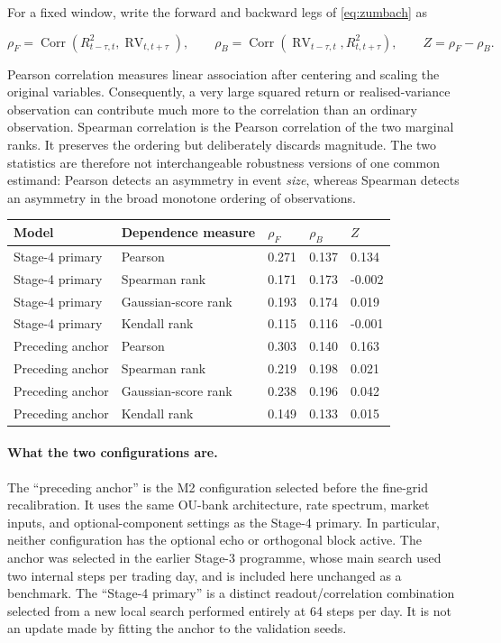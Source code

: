 \documentclass[11pt,a4paper]{article}
\newcommand{\Corr}{\operatorname{Corr}}
\begin{document}
For a fixed window, write the forward and backward legs of \cref{eq:zumbach} as

\begin{equation}
 \rho_F=\Corr\left(R_{t-\tau,t}^2,\operatorname{RV}_{t,t+\tau}\right),
 \qquad
 \rho_B=\Corr\left(\operatorname{RV}_{t-\tau,t},R_{t,t+\tau}^2\right),
 \qquad Z=\rho_F-\rho_B.
 \label{eq:zumbach-legs}
\end{equation}

Pearson correlation measures linear association after centering and scaling the original
variables. Consequently, a very large squared return or realised-variance observation can
contribute much more to the correlation than an ordinary observation. Spearman correlation is
the Pearson correlation of the two marginal ranks. It preserves the ordering but deliberately
discards magnitude. The two statistics are therefore not interchangeable robustness versions
of one common estimand: Pearson detects an asymmetry in event \emph{size}, whereas Spearman
detects an asymmetry in the broad monotone ordering of observations.

\begin{center}
\begin{tabularx}{0.94\textwidth}{@{}Y Y C{18mm} C{18mm} C{18mm}@{}}
\toprule
\textbf{Model} & \textbf{Dependence measure} & \(\rho_F\) & \(\rho_B\) & \(Z\) \\
\midrule
Stage-4 primary & Pearson & 0.271 & 0.137 & 0.134 \\
Stage-4 primary & Spearman rank & 0.171 & 0.173 & -0.002 \\
Stage-4 primary & Gaussian-score rank & 0.193 & 0.174 & 0.019 \\
Stage-4 primary & Kendall rank & 0.115 & 0.116 & -0.001 \\
\addlinespace
Preceding anchor & Pearson & 0.303 & 0.140 & 0.163 \\
Preceding anchor & Spearman rank & 0.219 & 0.198 & 0.021 \\
Preceding anchor & Gaussian-score rank & 0.238 & 0.196 & 0.042 \\
Preceding anchor & Kendall rank & 0.149 & 0.133 & 0.015 \\
\bottomrule
\end{tabularx}
\end{center}

\pagebreak
\paragraph{What the two configurations are.}
The ``preceding anchor'' is the M2 configuration selected before the fine-grid recalibration. It
uses the same OU-bank architecture, rate spectrum, market inputs, and optional-component
settings as the Stage-4 primary. In particular, neither configuration has the optional echo or
orthogonal block active. The anchor was selected in the earlier Stage-3 programme, whose main
search used two internal steps per trading day, and is included here unchanged as a benchmark.
The ``Stage-4 primary'' is a distinct readout/correlation combination selected from a new local
search performed entirely at 64 steps per day. It is not an update made by fitting the anchor to
the validation seeds.
\end{document}
